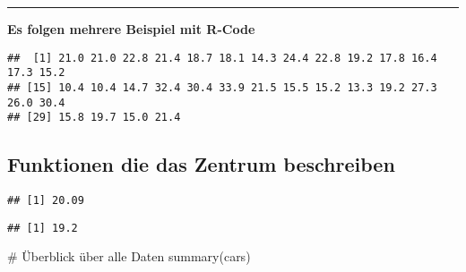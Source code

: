 \documentclass[]{article}
\newenvironment{Shaded}{\begin{snugshade}}{\end{snugshade}}
\newcommand{\KeywordTok}[1]{\textcolor[rgb]{0.94,0.87,0.69}{{#1}}}
\newcommand{\CommentTok}[1]{\textcolor[rgb]{0.50,0.62,0.50}{{#1}}}
\newcommand{\NormalTok}[1]{\textcolor[rgb]{0.80,0.80,0.80}{{#1}}}
\begin{document}
\begin{center}\rule{0.5\linewidth}{\linethickness}\end{center}

\textbf{Es folgen mehrere Beispiel mit R-Code}

\begin{Shaded}
\end{Shaded}

\begin{verbatim}
##  [1] 21.0 21.0 22.8 21.4 18.7 18.1 14.3 24.4 22.8 19.2 17.8 16.4 17.3 15.2
## [15] 10.4 10.4 14.7 32.4 30.4 33.9 21.5 15.5 15.2 13.3 19.2 27.3 26.0 30.4
## [29] 15.8 19.7 15.0 21.4
\end{verbatim}

\subsection{Funktionen die das Zentrum
beschreiben}\label{funktionen-die-das-zentrum-beschreiben}

\begin{Shaded}
\end{Shaded}

\begin{verbatim}
## [1] 20.09
\end{verbatim}

\begin{Shaded}
\end{Shaded}

\begin{verbatim}
## [1] 19.2
\end{verbatim}

\begin{Shaded}
\begin{Highlighting}[]
\CommentTok{# Überblick über alle Daten}
\KeywordTok{summary}\NormalTok{(cars)}
\end{Highlighting}
\end{Shaded}
\end{document}
